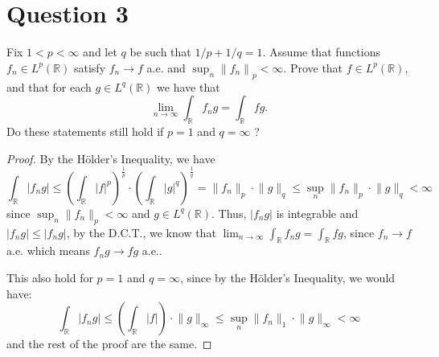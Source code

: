 \section{Question 3}

\begin{question}
    Fix $1<p<\infty$ and let $q$ be such that $1 / p+1 / q=1$. Assume that functions $f_n \in L^p(\mathbb{R})$ satisfy $f_n \rightarrow f$ a.e. and $\sup _n\left\|f_n\right\|_p<\infty$. Prove that $f \in L^p(\mathbb{R})$, and that for each $g \in L^q(\mathbb{R})$ we have that
    $$
    \lim _{n \rightarrow \infty} \int_{\mathbb{R}} f_n g=\int_{\mathbb{R}} f g .
    $$
    Do these statements still hold if $p=1$ and $q=\infty$ ?
\end{question}

\begin{answer}
    \begin{proof}
        By the Hölder's Inequality, we have
        \begin{equation}
            \int_{\mathbb{R}} \lvert f_ng \rvert \leq \left(\int_{\mathbb{R}}\lvert f \rvert^p\right)^{\frac{1}{p}} \cdot \left(\int_{\mathbb{R}}\lvert g \rvert^q\right)^{\frac{1}{q}} = \lVert f_n \rVert_p \cdot \lVert g \rVert_q \leq \sup_n \lVert f_n \rVert_p \cdot \lVert g \rVert_q < \infty
        \end{equation}
        since $\sup_n\lVert f_n \rVert_p < \infty$ and $g \in L^q(\mathbb{R})$. Thus, $\lvert f_ng\rvert$ is integrable and $\lvert f_ng \rvert \leq \lvert f_ng \rvert$, by the D.C.T., we know that $\lim_{n \to \infty} \int_{\mathbb{R}} f_ng = \int_{\mathbb{R}}fg$, since $f_n \to f$ a.e. which means $f_ng \to fg$ a.e..
        
        This also hold for $p = 1$ and $q = \infty$, since by the Hölder's Inequality, we would have:
        \begin{equation}
            \int_{\mathbb{R}} \lvert f_ng \rvert \leq \left(\int_{\mathbb{R}}\lvert f \rvert\right) \cdot \lVert g \rVert_{\infty} \leq \sup_n \lVert f_n \rVert_1 \cdot \lVert g \rVert_{\infty} < \infty
        \end{equation}
        and the rest of the proof are the same.
    \end{proof}
\end{answer}